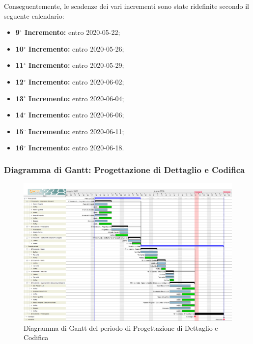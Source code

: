 Conseguentemente, le scadenze dei vari incrementi sono state ridefinite secondo il seguente calendario:
\begin{itemize}
	\item \textbf{9$^{\circ}$ Incremento:} entro 2020-05-22;
	\item \textbf{10$^{\circ}$ Incremento:} entro 2020-05-26;
	\item \textbf{11$^{\circ}$ Incremento:} entro 2020-05-29;
	\item \textbf{12$^{\circ}$ Incremento:} entro 2020-06-02;
	\item \textbf{13$^{\circ}$ Incremento:} entro 2020-06-04;
	\item \textbf{14$^{\circ}$ Incremento:} entro 2020-06-06;
	\item \textbf{15$^{\circ}$ Incremento:} entro 2020-06-11;
	\item \textbf{16$^{\circ}$ Incremento:} entro 2020-06-18.
\end{itemize}

\subsubsection{Diagramma di Gantt: Progettazione di Dettaglio e Codifica}
	\begin{figure}[h]
		\centering
		\includegraphics[width=1.1\textwidth]{./res/img/DiagrammiGantt/prog_dett_gantt.png}
		\caption{Diagramma di Gantt del periodo di Progettazione di Dettaglio e Codifica}
	\end{figure}


\newpage

